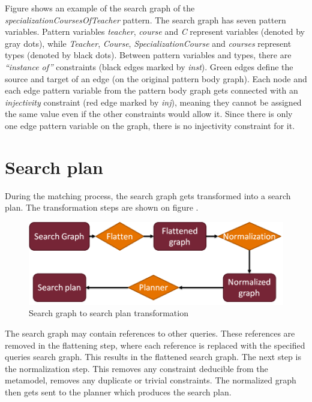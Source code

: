 Figure  shows an example of the search graph of the
\emph{specializationCoursesOfTeacher} pattern. The search graph has seven
pattern variables. Pattern variables \emph{teacher}, \emph{course} and \emph{C}
represent variables (denoted by gray dots), while \emph{Teacher},
\emph{Course}, \emph{SpecializationCourse} and \emph{courses} represent types
(denoted by black dots). Between pattern variables and types, there are
\emph{``instance of''} constraints (black edges marked by \emph{inst}). Green
edges define the source and target of an edge (on the original pattern body
graph). Each node and each edge pattern variable from the pattern body graph
gets connected with an \emph{injectivity} constraint (red edge marked by \emph{inj}), meaning they
cannot be assigned the same value even if the other constraints would allow it.
Since there is only one edge pattern variable on the graph, there is no
injectivity constraint for it.

\section{Search plan}\label{sec:SearchPlan}

During the matching process, the search graph gets transformed into a search
plan. The transformation steps are shown on figure .

\begin{figure}[!ht]
\centering
\includegraphics[width=130mm,
keepaspectratio]{figures/search_graph_plan_trans.png}
\caption{Search graph to search plan transformation}
\label{fig:graph_to_plan}
\end{figure}

The search graph may contain references to other queries. These references are
removed in the flattening step, where each reference is replaced with the
specified queries search graph. This results in the flattened search graph. The
next step is the normalization step. This removes any constraint deducible from
the metamodel, removes any duplicate or trivial constraints. The normalized
graph then gets sent to the planner which produces the search plan. 

